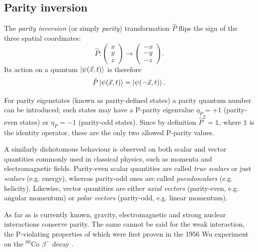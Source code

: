 \subsection{Parity inversion}
The \textit{parity inversion} (or simply \textit{parity}) transformation $\hat{P}$ flips the sign of the three spatial coordinates:
\begin{equation}
	\hat{P} : \begin{pmatrix}
		x \\ y \\ z
	\end{pmatrix}
	\rightarrow
	\begin{pmatrix}
		-x \\ -y \\ -z
	\end{pmatrix}.
\end{equation}
Its action on a quantum $\ket{\psi(\vec{x},t)}$ is therefore
\begin{equation}
	\hat{P} \ket{\psi(\vec{x},t)} = \ket{\psi(-\vec{x},t)}.
\end{equation}

For parity eigenstates (known as parity-defined states) a parity quantum number can be introduced;
such states may have a P-parity eigenvalue $\eta_P = +1$ (parity-even states) or $\eta_P = -1$ (parity-odd states).
Since by definition $\hat{P}^2 = \mathds{1}$, where $\mathds{1}$ is the identity operator, these are the only two allowed P-parity values.

A similarly dichotomous behaviour is observed on both scalar and vector quantities commonly used in classical physics, such as momenta and electromagnetic fields.
Parity-even scalar quantities are called \textit{true scalars} or just \textit{scalars} (e.g. energy), whereas parity-odd ones are called \textit{pseudoscalars} (e.g. helicity).
Likewise, vector quantities are either \textit{axial vectors} (parity-even, e.g. angular momentum) or \textit{polar vectors} (parity-odd, e.g. linear momentum).

As far as is currently known, gravity, electromagnetic and strong nuclear interactions conserve parity.
The same cannot be said for the weak interaction, the P-violating properties of which were first proven in the 1956 Wu experiment on the $^{60}\text{Co}$ $\beta^-$ decay \cite{wu}. 

